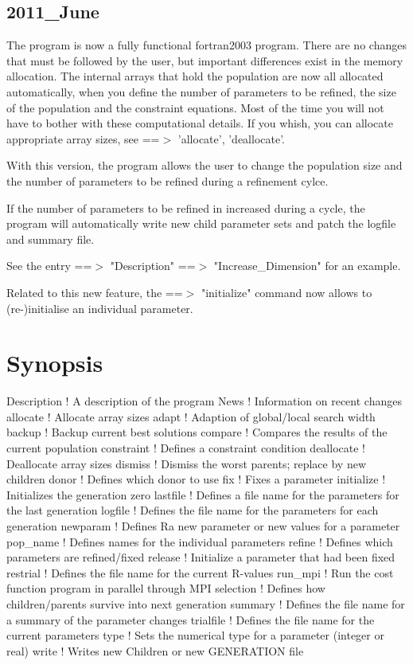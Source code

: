\subsection*{2011\_June}
\par
The program is now a fully functional fortran2003 program. 
There are no changes that must be followed by the user, but important 
differences exist in the memory allocation. The internal arrays that hold 
the population are now all allocated automatically, when you define the 
number of parameters to be refined, the size of the population and the 
constraint equations. Most of the time you will not have to bother with 
these computational details. If you whish, you can allocate appropriate 
array sizes, see ==$> $ 'allocate', 'deallocate'. 
\par
With this version, the program allows the user to change the population 
size and the number of parameters to be refined during a refinement cylce. 
\par
If the number of parameters to be refined in increased during a cycle, 
the program will automatically write new child parameter sets and patch 
the logfile and summary file. 
\par
See the entry ==$> $ "Description" ==$> $ "Increase\_Dimension" for an example. 
\par
Related to this new feature, the ==$> $ "initialize" command now allows to 
(re-)initialise an individual parameter. 
\par
\section{Synopsis}
\par
\begin{MacVerbatim}
Description ! A description of the program
News        ! Information on recent changes
allocate    ! Allocate array sizes
adapt       ! Adaption of global/local search width
backup      ! Backup current best solutions
compare     ! Compares the results of the current population
constraint  ! Defines a constraint condition
deallocate  ! Deallocate array sizes
dismiss     ! Dismiss the worst parents; replace by new children
donor       ! Defines which donor to use
fix         ! Fixes a parameter
initialize  ! Initializes the generation zero
lastfile    ! Defines a file name for the parameters for the last generation
logfile     ! Defines the file name for the parameters for each generation
newparam    ! Defines Ra new parameter or new values for a parameter
pop_name    ! Defines names for the individual parameters
refine      ! Defines which parameters are refined/fixed
release     ! Initialize a parameter that had been fixed
restrial    ! Defines the file name for the current R-values
run_mpi     ! Run the cost function program in parallel through MPI
selection   ! Defines how children/parents survive into next generation
summary     ! Defines the file name for a summary of the parameter changes
trialfile   ! Defines the file name for the current parameters
type        ! Sets the numerical type for a parameter (integer or real)
write       ! Writes new Children or new GENERATION file
\end{MacVerbatim}
